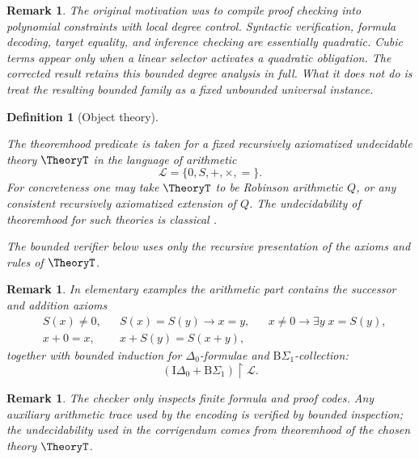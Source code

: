 \documentclass[letterpaper,10pt]{article}
\theoremstyle{upright}
\theoremstyle{upright}
\newtheorem{remark}[theorem]{Remark}
\newtheorem{definition}[theorem]{Definition}
\begin{document}
\begin{remark}
	The original motivation was to compile proof checking into polynomial constraints with local degree control. Syntactic verification, formula decoding, target equality, and inference checking are essentially quadratic. Cubic terms appear only when a linear selector activates a quadratic obligation. The corrected result retains this bounded degree analysis in full. What it does not do is treat the resulting bounded family as a fixed unbounded universal instance.
\end{remark}

\begin{definition}[Object theory]
\label{def:register-arithmetic}

	The theoremhood predicate is taken for a fixed recursively axiomatized undecidable theory $\TheoryT$ in the language of arithmetic
		\begin{equation}
			\mathcal{L} = \{0,S,+,\times,=\}.
		\end{equation}
	For concreteness one may take $\TheoryT$ to be Robinson arithmetic $Q$, or any consistent recursively axiomatized extension of $Q$. The undecidability of theoremhood for such theories is classical \citep{kleene52,boolos07}.

	The bounded verifier below uses only the recursive presentation of the axioms and rules of $\TheoryT$.
\end{definition}

\begin{remark}
	In elementary examples the arithmetic part contains the successor and addition axioms
	\begin{align}
		&S(x) \ne 0, &
		&S(x)=S(y)\to x=y, &
		&x\ne 0\to \exists y\;x=S(y),\\
		&x+0=x, &
		&x+S(y)=S(x+y),
	\end{align}
	together with bounded induction for $\Delta_0$-formulae and $\mathrm{B}\Sigma_1$-collection:
	\begin{equation}
		(\mathrm{I}\Delta_0+\mathrm{B}\Sigma_1)\upharpoonright\mathcal{L}.
	\end{equation}
\end{remark}

\begin{remark}
	The checker only inspects finite formula and proof codes. Any auxiliary arithmetic trace used by the encoding is verified by bounded inspection; the undecidability used in the corrigendum comes from theoremhood of the chosen theory $\TheoryT$.
\end{remark}
\end{document}
